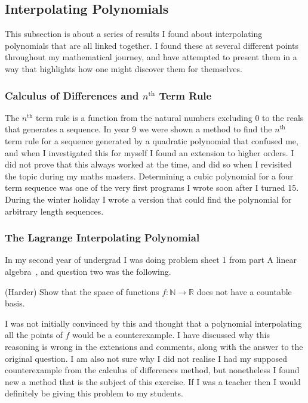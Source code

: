 \subsection{Interpolating Polynomials}

This subsection is about a series of results I found about interpolating polynomials that are all linked together. I found these at several different points throughout my mathematical journey, and have attempted to present them in a way that highlights how one might discover them for themselves.

\subsubsection{Calculus of Differences and $n^\text{th}$ Term Rule}

The $n^\text{th}$ term rule is a function from the natural numbers excluding 0 to the reals that generates a sequence. In year 9 we were shown a method to find the $n^\text{th}$ term rule for a sequence generated by a quadratic polynomial that confused me, and when I investigated this for myself I found an extension to higher orders. I did not prove that this always worked at the time, and did so when I revisited the topic during my maths masters. Determining a cubic polynomial for a four term sequence was one of the very first programs I wrote soon after I turned 15. During the winter holiday I wrote a version that could find the polynomial for arbitrary length sequences.

\subsubsection{The Lagrange Interpolating Polynomial}

In my second year of undergrad I was doing problem sheet 1 from part A linear algebra~\cite{PartALinearAlgebraSheet1}, and question two was the following.

\begin{center}
    (Harder) Show that the space of functions $f : \mathbb{N} \to \mathbb{R}$ does not have a countable basis.
\end{center}

I was not initially convinced by this and thought that a polynomial interpolating all the points of $f$ would be a counterexample. I have discussed why this reasoning is wrong in the extensions and comments, along with the answer to the original question. I am also not sure why I did not realise I had my supposed counterexample from the calculus of differences method, but nonetheless I found new a method that is the subject of this exercise. If I was a teacher then I would definitely be giving this problem to my students.

